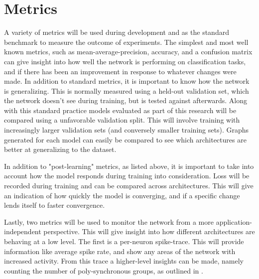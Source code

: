     \section{Metrics} \label{section:metrics}
    A variety of metrics will be used during development and as the standard benchmark to measure the outcome of experiments. The simplest and most well known metrics, such as mean-average-precision, accuracy, and a confusion matrix can give insight into how well the network is performing on classification tasks, and if there has been an improvement in response to whatever changes were made. In addition to standard metrics, it is important to know how the network is generalizing. This is normally measured using a held-out validation set, which the network doesn't see during training, but is tested against afterwards. Along with this standard practice models evaluated as part of this research will be compared using a unfavorable validation split. This will involve training with increasingly larger validation sets (and conversely smaller training sets). Graphs generated for each model can easily be compared to see which architectures are better at generalizing to the dataset.
    
    In addition to "post-learning" metrics, as listed above, it is important to take into account how the model responds during training into consideration. Loss will be recorded during training and can be compared across architectures. This will give an indication of how quickly the model is converging, and if a specific change lends itself to faster convergence.
    
    Lastly, two metrics will be used to monitor the network from a more application-independent perspective. This will give insight into how different architectures are behaving at a low level. The first is a per-neuron spike-trace. This will provide information like average spike rate, and show any areas of the network with increased activity. From this trace a higher-level insights can be made, namely counting the number of poly-synchronous groups, as outlined in \cite{sgnn_transistor}.
    
